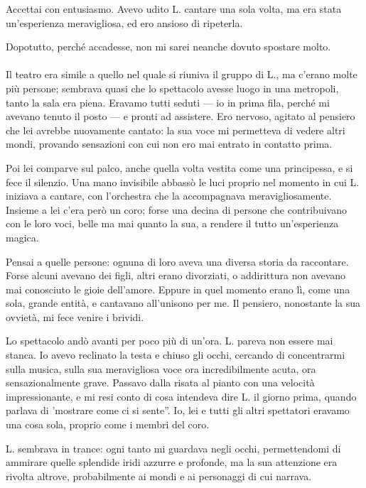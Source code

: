 \documentclass[a4paper,12pt]{book}
\begin{document}
Accettai con entusiasmo. Avevo udito L. cantare una sola volta, ma era stata
un'esperienza meravigliosa, ed ero ansioso di ripeterla.

Dopotutto, perché accadesse, non mi sarei neanche dovuto spostare molto.

\paragraph{}
Il teatro era simile a quello nel quale si riuniva il gruppo di L., ma c'erano
molte più persone; sembrava quasi che lo spettacolo avesse luogo in una metropoli,
tanto la sala era piena. Eravamo tutti seduti --- io in prima fila, perché mi
avevano tenuto il posto --- e pronti ad assistere. Ero nervoso, agitato al
pensiero che lei avrebbe nuovamente cantato: la sua voce mi permetteva di vedere
altri mondi, provando sensazioni con cui non ero mai entrato in contatto prima.

Poi lei comparve sul palco, anche quella volta vestita come una principessa, e si
fece il silenzio. Una mano invisibile abbassò le luci proprio nel momento in cui
L. iniziava a cantare, con l'orchestra che la accompagnava meravigliosamente.
Insieme a lei c'era però un coro; forse una decina di persone che contribuivano
con le loro voci, belle ma mai quanto la sua, a rendere il tutto un'esperienza
magica.

Pensai a quelle persone: ognuna di loro aveva una diversa storia da raccontare.
Forse alcuni avevano dei figli, altri erano divorziati, o addirittura non avevano
mai conosciuto le gioie dell'amore. Eppure in quel momento erano lì, come una
sola, grande entità, e cantavano all'unisono per me. Il pensiero, nonostante la
sua ovvietà, mi fece venire i brividi.

Lo spettacolo andò avanti per poco più di un'ora. L. pareva non essere mai
stanca. Io avevo reclinato la testa e chiuso gli occhi, cercando di concentrarmi
sulla musica, sulla sua meravigliosa voce ora incredibilmente acuta, ora
sensazionalmente grave. Passavo dalla risata al pianto con una velocità impressionante,
e mi resi conto di cosa intendeva dire L. il giorno prima, quando parlava di
'mostrare come ci si sente''. Io, lei e tutti gli altri spettatori eravamo una
cosa sola, proprio come i membri del coro.

L. sembrava in trance: ogni tanto mi guardava negli occhi, permettendomi di
ammirare quelle splendide iridi azzurre e profonde, ma la sua attenzione era
rivolta altrove, probabilmente ai mondi e ai personaggi di cui narrava.
\end{document}

